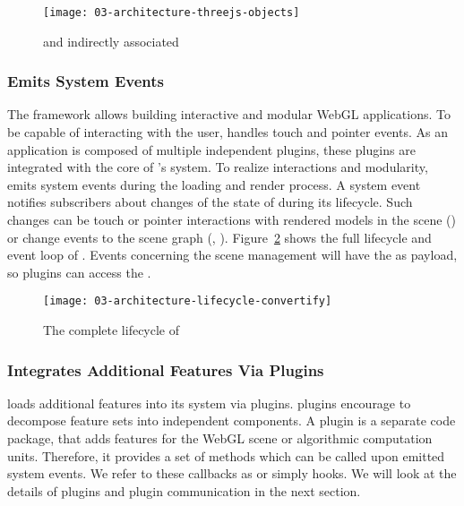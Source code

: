 \documentclass[../../ClassicThesis.tex]{subfiles}
\begin{document}
\begin{figure}[h]
  \centering
  \texttt{[image: 03-architecture-threejs-objects]}
  \caption{ and indirectly associated }
  \label{fig:nodes-and-three}
\end{figure}

\subsubsection{{\convertify} Emits System Events}
\label{convertify-emits-events}

The framework allows building interactive and modular WebGL
applications. To be capable of interacting with the user,
{\convertify} handles touch and pointer events. As an
application is composed of multiple independent plugins,
these plugins are integrated with the core of
{\convertify}'s system. To realize interactions and
modularity, {\convertify} emits system events during the
loading and render process. A system event notifies
subscribers about changes of the state of {\convertify}
during its lifecycle. Such changes can be touch or pointer
interactions with rendered models in the scene
() or change events to the scene graph
(, ).
Figure~\ref{fig:lifecycle} shows the full lifecycle and
event loop of {\convertify}. Events concerning the scene
management will have the  as payload, so plugins
can access the .

\begin{figure}[h]
  \centering
  \texttt{[image: 03-architecture-lifecycle-convertify]}
  \caption{The complete lifecycle of {\convertify}}
  \label{fig:lifecycle}
\end{figure}

\subsubsection{{\convertify} Integrates Additional Features
  Via Plugins}

{\convertify} loads additional features into its system via
plugins. plugins encourage to decompose feature sets into
independent components. A plugin is a separate code package,
that adds features for the WebGL scene or algorithmic
computation units. Therefore, it provides a set of methods
which can be called upon emitted system events. We refer to
these callbacks as  or simply hooks. We
will look at the details of plugins and plugin communication
in the next section.
\end{document}
